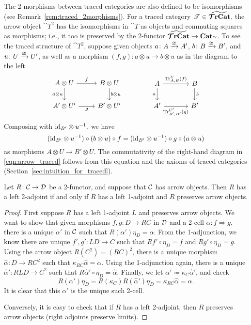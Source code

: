 \documentclass[11pt,oneside,article]{memoir}
\begin{document}
\begin{example}
The 2-morphisms between traced categories are also defined to be isomorphisms (see
Remark~\ref{rem:traced_2morphisms}). For a traced category $\mathscr{T}\in\widetilde{\bm{\mathcal{T}}\mathbf{rCat}}$, the arrow
object $\cat{T}^2$ has the isomorphisms in $\cat{T}$ as objects and commuting squares as morphisms;
i.e., it too is preserved by the 2-functor $\widetilde{\bm{\mathcal{T}}\mathbf{rCat}}\to\mathbf{Cat}_{\cong}$. To see the traced
structure of $\cat{T}^2$, suppose given objects $a\colon A\xrightarrow{\cong} A'$, $b\colon B\xrightarrow{\cong} B'$,
and $u\colon U\xrightarrow{\cong} U'$, as well as a morphism $(f,g)\colon a\otimes u\to b\otimes u$ as in the
diagram to the left
\begin{equation}
      \label{eqn:arrow_traced}
   \begin{tikzcd}
      A\otimes U\ar[d,"a\otimes u"']\ar[r,"f"]&B\otimes U\ar[d,"b\otimes u"]\\
      A'\otimes U'\ar[r,"g"']&B'\otimes U'
   \end{tikzcd}
   \qquad\qquad
   \begin{tikzcd}[column sep=large]
      A\ar[d,"a"']\ar[r,"\Tr^U_{A,B}(f)"]&B\ar[d,"b"]\\
      A'\ar[r,"\Tr^{U'}_{A',B'}(g)"']&B'
   \end{tikzcd}
\end{equation}
Composing with $\mathrm{id}_{B'}\otimes u^{-1}$, we have
\[
   (\mathrm{id}_{B'}\otimes u^{-1})\circ(b\otimes u)\circ f
      =(\mathrm{id}_{B'}\otimes u^{-1})\circ g\circ(a\otimes u)
\]
as morphisms $A\otimes U\to B'\otimes U$. The commutativity of the right-hand diagram in
\eqref{eqn:arrow_traced} follows from this equation and the axioms of traced categories
(Section~\ref{sec:intuition_for_traced}).
\end{example}

\begin{lemma}
      \label{lem:2_adjunction}
   Let $R\colon\mathcal{C}\to\mathcal{D}$ be a 2-functor, and suppose that $\mathcal{C}$ has arrow objects.
   Then $R$ has a left 2-adjoint if and only if $R$ has a left 1-adjoint and $R$ preserves arrow
   objects.
\end{lemma}
\begin{proof}
   First suppose $R$ has a left 1-adjoint $L$ and preserves arrow objects. We want to show that
   given morphisms $f,g\colon D\to RC$ in $\mathcal{D}$ and a 2-cell $\alpha\colon f\Rightarrow g$,
   there is a unique $\alpha'$ in $\mathcal{C}$ such that $R(\alpha')\eta_D=\alpha$. From the
   1-adjunction, we know there are unique $f',g'\colon LD\to C$ such that $Rf'\circ\eta_D=f$ and
   $Rg'\circ\eta_D=g$. Using the arrow object $R(C^2)=(RC)^2$, there is a unique morphism
   $\hat{\alpha}\colon D\to RC^2$ such that $\kappa_{RC}\hat{\alpha}=\alpha$. Using the 1-adjunction
   again, there is a unique $\hat{\alpha}'\colon RLD\to C^2$ such that
   $R\hat{\alpha}'\circ\eta_D=\hat{\alpha}$. Finally, we let
   $\alpha'\coloneqq\kappa_C\hat{\alpha}'$, and check
   \[
      R(\alpha')\eta_D = R(\kappa_C)R(\hat{\alpha}')\eta_D = \kappa_{RC}\hat{\alpha} = \alpha.
   \]
   It is clear that this $\alpha'$ is the unique such 2-cell.

   Conversely, it is easy to check that if $R$ has a left 2-adjoint, then $R$ preserves arrow
   objects (right adjoints preserve limits).
\end{proof}
\end{document}

